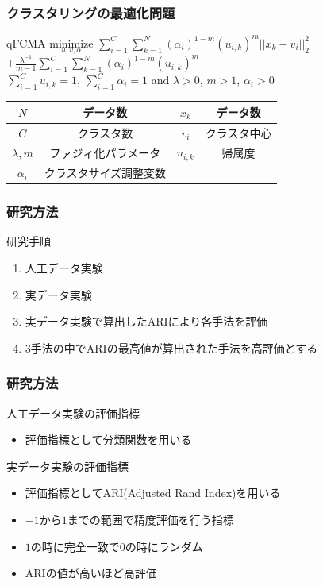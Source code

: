 \documentclass[13pt,dvipdfmx]{beamer}
\begin{document}
\begin{frame}\frametitle{クラスタリングの最適化問題}
  \begin{block}{qFCMA}
    \quad$\underset{u,v,\alpha}{\text{minimize}}$
    $\sum_{i=1}^C\sum_{k=1}^N(\alpha_{i})^{1-m}(u_{i,k})^m||x_k-v_i||_2^2$
    $+\frac{\lambda^{-1}}{m-1}\sum_{i=1}^C\sum_{k=1}^N(\alpha_{i})^{1-m}(u_{i,k})^m$\\
    \qquad{}$\sum_{i=1}^Cu_{i,k}=1$\;, \;$\sum_{i=1}^C\alpha_{i}=1$\; and \;$\lambda>0$\;, \;$m>1$\;, \;$\alpha_{i}>0$
  \end{block}
  \begin{center}
    \begin{tabular}{c|c||c|c} \hline
	  {$N$}&データ数&{$x_k$}&データ数 \\ \hline
	  {$C$}&クラスタ数&{$v_i$}&クラスタ中心\\ \hline
	  {$\lambda,m$}&ファジィ化パラメータ&{$u_{i,k}$}&帰属度 \\ \hline
	  {$\alpha_i$}&クラスタサイズ調整変数\\ \hline
    \end{tabular}
  \end{center}
\end{frame}

\begin{frame}\frametitle{研究方法}
 \begin{block}{研究手順}
   \begin{enumerate}
    \item 人工データ実験
    \item 実データ実験
    \item 実データ実験で算出したARIにより各手法を評価
    \item 3手法の中でARIの最高値が算出された手法を高評価とする
   \end{enumerate}
  \end{block}
\end{frame}

\begin{frame}\frametitle{研究方法}
 \begin{block}{人工データ実験の評価指標}
  \begin{itemize}
   \item 評価指標として分類関数を用いる
  \end{itemize}
 \end{block}
 \begin{block}{実データ実験の評価指標}
  \begin{itemize}
   \item 評価指標としてARI(Adjusted Rand Index)を用いる
   \item $-1$から$1$までの範囲で精度評価を行う指標
   \item $1$の時に完全一致で$0$の時にランダム
   \item ARIの値が高いほど高評価
  \end{itemize}
 \end{block}
\end{frame}
\end{document}
